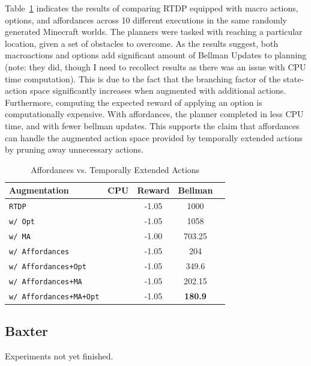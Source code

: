 \documentclass[conference]{IEEEtran}
\begin{document}
Table~\ref{table:temp_ext_act_results} indicates the results of comparing RTDP
equipped with macro actions, options, and affordances across 10 different executions
in the same randomly generated Minecraft worlds. The planners were tasked with 
reaching a particular location, given a set of obstacles to overcome. As the results 
suggest, both macroactions and options add significant amount of Bellman Updates to 
planning (note: they did, though I need to recollect results as there was an issue with CPU time computation). 
This is due to the fact that the branching factor of the state-action space significantly increases when augmented with additional 
actions. Furthermore, computing the expected reward of applying an option is computationally 
expensive. With affordances, the planner completed in less CPU time, and with fewer 
bellman updates. This supports the claim that affordances can handle the augmented 
action space provided by temporally extended actions by pruning away unnecessary actions.

\begin{table}[H]
\centering
\begin{tabular}{ l  || c c c c}
  Augmentation 						&	CPU	&	Reward 	& Bellman \\ \hline
  \texttt{RTDP}  						&		&	-1.05		&	1000		\\
  \texttt{w/ Opt}  					&		&	-1.05		&	1058		\\
  \texttt{w/ MA}  						&		&	-1.00		&	703.25		\\
  \texttt{w/ Affordances}  				& 		&	-1.05		&	204		\\
  \texttt{w/ Affordances+Opt}  			& 		&	-1.05		&	349.6		\\
   \texttt{w/ Affordances+MA}  			& 		&	-1.05		&	202.15		\\
   \texttt{w/ Affordances+MA+Opt}  		& 		&	-1.05		&	{\bf 180.9}		\\
\end{tabular}
\caption{Affordances vs. Temporally Extended Actions}
\label{table:temp_ext_act_results}
\end{table}

\subsection{Baxter}

Experiments not yet finished.
\end{document}
